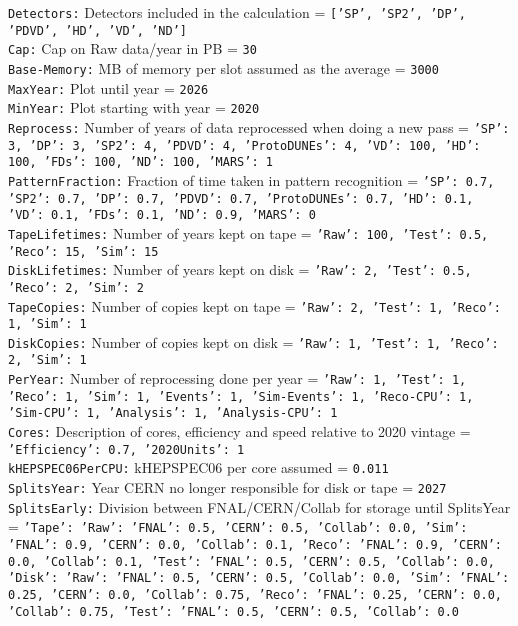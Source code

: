 
{\tt Detectors:} Detectors included in the calculation = {\tt ['SP', 'SP2', 'DP', 'PDVD', 'HD', 'VD', 'ND']} \\
{\tt Cap:} Cap on Raw data/year in PB = {\tt 30} \\
{\tt Base-Memory:} MB of memory per slot assumed as the average = {\tt 3000} \\
{\tt MaxYear:} Plot until year = {\tt 2026} \\
{\tt MinYear:} Plot starting with year = {\tt 2020} \\
{\tt Reprocess:} Number of years of data reprocessed when doing a new pass = {\tt {'SP': 3, 'DP': 3, 'SP2': 4, 'PDVD': 4, 'ProtoDUNEs': 4, 'VD': 100, 'HD': 100, 'FDs': 100, 'ND': 100, 'MARS': 1}} \\
{\tt PatternFraction:} Fraction of time taken in pattern recognition = {\tt {'SP': 0.7, 'SP2': 0.7, 'DP': 0.7, 'PDVD': 0.7, 'ProtoDUNEs': 0.7, 'HD': 0.1, 'VD': 0.1, 'FDs': 0.1, 'ND': 0.9, 'MARS': 0}} \\
{\tt TapeLifetimes:} Number of years kept on tape = {\tt {'Raw': 100, 'Test': 0.5, 'Reco': 15, 'Sim': 15}} \\
{\tt DiskLifetimes:} Number of years kept on disk = {\tt {'Raw': 2, 'Test': 0.5, 'Reco': 2, 'Sim': 2}} \\
{\tt TapeCopies:} Number of copies kept on tape = {\tt {'Raw': 2, 'Test': 1, 'Reco': 1, 'Sim': 1}} \\
{\tt DiskCopies:} Number of copies kept on disk = {\tt {'Raw': 1, 'Test': 1, 'Reco': 2, 'Sim': 1}} \\
{\tt PerYear:} Number of reprocessing done per year = {\tt {'Raw': 1, 'Test': 1, 'Reco': 1, 'Sim': 1, 'Events': 1, 'Sim-Events': 1, 'Reco-CPU': 1, 'Sim-CPU': 1, 'Analysis': 1, 'Analysis-CPU': 1}} \\
{\tt Cores:} Description of cores, efficiency and speed relative to 2020 vintage = {\tt {'Efficiency': 0.7, '2020Units': 1}} \\
{\tt kHEPSPEC06PerCPU:} kHEPSPEC06 per core assumed = {\tt 0.011} \\
{\tt SplitsYear:} Year CERN no longer responsible for disk or tape = {\tt 2027} \\
{\tt SplitsEarly:} Division between FNAL/CERN/Collab for storage until SplitsYear = {\tt {'Tape': {'Raw': {'FNAL': 0.5, 'CERN': 0.5, 'Collab': 0.0}, 'Sim': {'FNAL': 0.9, 'CERN': 0.0, 'Collab': 0.1}, 'Reco': {'FNAL': 0.9, 'CERN': 0.0, 'Collab': 0.1}, 'Test': {'FNAL': 0.5, 'CERN': 0.5, 'Collab': 0.0}}, 'Disk': {'Raw': {'FNAL': 0.5, 'CERN': 0.5, 'Collab': 0.0}, 'Sim': {'FNAL': 0.25, 'CERN': 0.0, 'Collab': 0.75}, 'Reco': {'FNAL': 0.25, 'CERN': 0.0, 'Collab': 0.75}, 'Test': {'FNAL': 0.5, 'CERN': 0.5, 'Collab': 0.0}}}} \\
